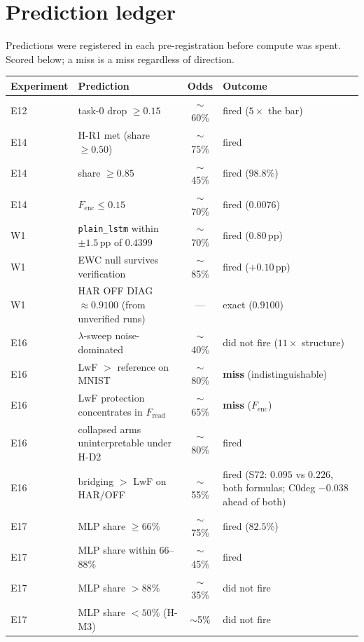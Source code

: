 \section{Prediction ledger}
\label{app:predictions}

Predictions were registered in each pre-registration before compute was spent.
Scored below; a miss is a miss regardless of direction.

\begin{center}\small
\begin{tabular}{@{}llcl@{}}
\toprule
Experiment & Prediction & Odds & Outcome \\
\midrule
E12 & task-0 drop $\ge 0.15$ & $\sim$60\% & fired ($5\times$ the bar) \\
E14 & H-R1 met (share $\ge 0.50$) & $\sim$75\% & fired \\
E14 & share $\ge 0.85$ & $\sim$45\% & fired ($98.8\%$) \\
E14 & $F_{\mathrm{enc}} \le 0.15$ & $\sim$70\% & fired ($0.0076$) \\
W1  & \texttt{plain\_lstm} within $\pm1.5$\,pp of $0.4399$ & $\sim$70\% & fired ($0.80$\,pp) \\
W1  & EWC null survives verification & $\sim$85\% & fired ($+0.10$\,pp) \\
W1  & HAR OFF DIAG $\approx 0.9100$ (from unverified runs) & --- & exact ($0.9100$) \\
E16 & $\lambda$-sweep noise-dominated & $\sim$40\% & did not fire ($11\times$ structure) \\
E16 & LwF $>$ reference on MNIST & $\sim$80\% & \textbf{miss} (indistinguishable) \\
E16 & LwF protection concentrates in $F_{\mathrm{read}}$ & $\sim$65\% & \textbf{miss} ($F_{\mathrm{enc}}$) \\
E16 & collapsed arms uninterpretable under H-D2 & $\sim$80\% & fired \\
E16 & bridging $>$ LwF on HAR/OFF & $\sim$55\% & fired (S72: $0.095$ vs $0.226$, both formulas; C0deg $-0.038$ ahead of both) \\
E17 & MLP share $\ge 66\%$ & $\sim$75\% & fired ($82.5\%$) \\
E17 & MLP share within 66--88\% & $\sim$45\% & fired \\
E17 & MLP share $> 88\%$ & $\sim$35\% & did not fire \\
E17 & MLP share $< 50\%$ (H-M3) & $\sim$5\% & did not fire \\

\end{tabular}
\end{center}

